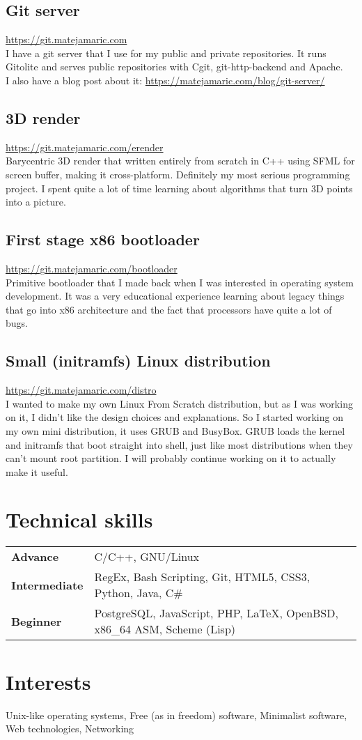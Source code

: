 \documentclass{article}
\begin{document}
\subsection{Git server}
\hfill\url{https://git.matejamaric.com}\\
I have a git server that I use for my public and private repositories. It runs Gitolite and serves public repositories with Cgit, 
git-http-backend and Apache.\\
I also have a blog post about it: \url{https://matejamaric.com/blog/git-server/}
\\
\subsection{3D render}
\hfill\url{https://git.matejamaric.com/erender}\\
Barycentric 3D render that written entirely from scratch in C++ using SFML for screen buffer, making it cross-platform.
Definitely my most serious programming project. 
I spent quite a lot of time learning about algorithms that turn 3D points into a picture.
\\
\subsection{First stage x86 bootloader}
\hfill\url{https://git.matejamaric.com/bootloader}\\
Primitive bootloader that I made back when I was interested in operating system development. 
It was a very educational experience learning about legacy things that go into x86 architecture and 
the fact that processors have quite a lot of bugs.
\\
\subsection{Small (initramfs) Linux distribution}
\hfill\url{https://git.matejamaric.com/distro}\\
I wanted to make my own Linux From Scratch distribution, but as I was working on it, I didn't like the design choices and explanations.
So I started working on my own mini distribution, it uses GRUB and BusyBox. 
GRUB loads the kernel and initramfs that boot straight into shell, just like most distributions when they can't mount root partition.
I will probably continue working on it to actually make it useful. 

\section{Technical skills}
\begin{tabular}{ @{} l l }
\large\textbf{Advance}       & \normalsize C/C++, GNU/Linux\\
\large\textbf{Intermediate}  & \normalsize RegEx, Bash Scripting, Git, HTML5, CSS3, Python, Java, C\#\\
\large\textbf{Beginner}      & \normalsize PostgreSQL, JavaScript, PHP, \LaTeX, OpenBSD, x86\_64 ASM, Scheme (Lisp)
\end{tabular}

\section{Interests}
Unix-like operating systems, Free (as in freedom) software, Minimalist software, Web technologies, Networking
\end{document}

